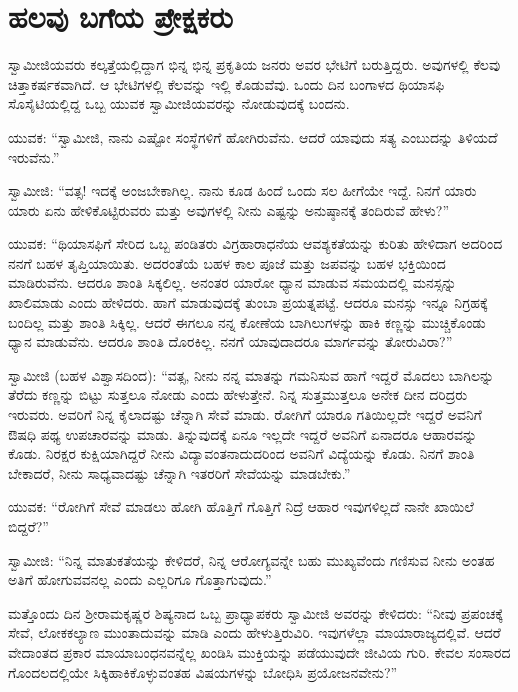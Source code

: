 
\chapter{ಹಲವು ಬಗೆಯ ಪ್ರೇಕ್ಷಕರು}

 ಸ್ವಾಮೀಜಿಯವರು ಕಲ್ಕತ್ತೆಯಲ್ಲಿದ್ದಾಗ ಭಿನ್ನ ಭಿನ್ನ ಪ್ರಕೃತಿಯ ಜನರು ಅವರ ಭೇಟಿಗೆ ಬರುತ್ತಿದ್ದರು. ಅವುಗಳಲ್ಲಿ ಕೆಲವು ಚಿತ್ತಾಕರ್ಷಕವಾಗಿದೆ. ಆ ಭೇಟಿಗಳಲ್ಲಿ ಕೆಲವನ್ನು ಇಲ್ಲಿ ಕೊಡುವೆವು. ಒಂದು ದಿನ ಬಂಗಾಳದ ಥಿಯಾಸಫಿ ಸೊಸೈಟಿಯಲ್ಲಿದ್ದ ಒಬ್ಬ ಯುವಕ ಸ್ವಾಮೀಜಿಯವರನ್ನು ನೋಡುವುದಕ್ಕೆ ಬಂದನು. 

 ಯುವಕ: “ಸ್ವಾಮೀಜಿ, ನಾನು ಎಷ್ಟೋ ಸಂಸ್ಥೆಗಳಿಗೆ ಹೋಗಿರುವೆನು. ಆದರೆ ಯಾವುದು ಸತ್ಯ ಎಂಬುದನ್ನು ತಿಳಿಯದೆ ಇರುವೆನು.” 

 ಸ್ವಾಮೀಜಿ: “ವತ್ಸ! ಇದಕ್ಕೆ ಅಂಜಬೇಕಾಗಿಲ್ಲ. ನಾನು ಕೂಡ ಹಿಂದೆ ಒಂದು ಸಲ ಹೀಗೆಯೇ ಇದ್ದೆ. ನಿನಗೆ ಯಾರು ಯಾರು ಏನು ಹೇಳಿಕೊಟ್ಟಿರುವರು ಮತ್ತು ಅವುಗಳಲ್ಲಿ ನೀನು ಎಷ್ಟನ್ನು ಅನುಷ್ಠಾನಕ್ಕೆ ತಂದಿರುವೆ ಹೇಳು?” 

 ಯುವಕ: “ಥಿಯಾಸಫಿಗೆ ಸೇರಿದ ಒಬ್ಬ ಪಂಡಿತರು ವಿಗ್ರಹಾರಾಧನೆಯ ಆವಶ್ಯಕತೆಯನ್ನು ಕುರಿತು ಹೇಳಿದಾಗ ಅದರಿಂದ ನನಗೆ ಬಹಳ ತೃಪ್ತಿಯಾಯಿತು. ಅದರಂತೆಯೆ ಬಹಳ ಕಾಲ ಪೂಜೆ ಮತ್ತು ಜಪವನ್ನು ಬಹಳ ಭಕ್ತಿಯಿಂದ ಮಾಡಿರುವೆನು. ಆದರೂ ಶಾಂತಿ ಸಿಕ್ಕಲಿಲ್ಲ. ಅನಂತರ ಯಾರೋ ಧ್ಯಾನ ಮಾಡುವ ಸಮಯದಲ್ಲಿ ಮನಸ್ಸನ್ನು ಖಾಲಿಮಾಡು ಎಂದು ಹೇಳಿದರು. ಹಾಗೆ ಮಾಡುವುದಕ್ಕೆ ತುಂಬಾ ಪ್ರಯತ್ನಪಟ್ಟೆ. ಆದರೂ ಮನಸ್ಸು ಇನ್ನೂ ನಿಗ್ರಹಕ್ಕೆ ಬಂದಿಲ್ಲ ಮತ್ತು ಶಾಂತಿ ಸಿಕ್ಕಿಲ್ಲ. ಆದರೆ ಈಗಲೂ ನನ್ನ ಕೋಣೆಯ ಬಾಗಿಲುಗಳನ್ನು ಹಾಕಿ ಕಣ್ಣನ್ನು ಮುಚ್ಚಿಕೊಂಡು ಧ್ಯಾನ ಮಾಡುವೆನು. ಆದರೂ ಶಾಂತಿ ದೊರಕಿಲ್ಲ. ನನಗೆ ಯಾವುದಾದರೂ ಮಾರ್ಗವನ್ನು ತೋರುವಿರಾ?”‌ 

\vskip 1pt

 ಸ್ವಾಮೀಜಿ (ಬಹಳ ವಿಶ್ವಾಸದಿಂದ): “ವತ್ಸ, ನೀನು ನನ್ನ ಮಾತನ್ನು ಗಮನಿಸುವ ಹಾಗೆ ಇದ್ದರೆ ಮೊದಲು ಬಾಗಿಲನ್ನು ತೆರೆದು ಕಣ್ಣನ್ನು ಬಿಟ್ಟು ಸುತ್ತಲೂ ನೋಡು ಎಂದು ಹೇಳುತ್ತೇನೆ. ನಿನ್ನ ಸುತ್ತಮುತ್ತಲೂ‌ ಅನೇಕ ದೀನ ದರಿದ್ರರು ಇರುವರು. ಅವರಿಗೆ ನಿನ್ನ ಕೈಲಾದಷ್ಟು ಚೆನ್ನಾಗಿ ಸೇವೆ ಮಾಡು. ರೋಗಿಗೆ ಯಾರೂ ಗತಿಯಿಲ್ಲದೇ ಇದ್ದರೆ ಅವನಿಗೆ ಔಷಧಿ ಪಥ್ಯ ಉಪಚಾರವನ್ನು ಮಾಡು. ತಿನ್ನುವುದಕ್ಕೆ ಏನೂ ಇಲ್ಲದೇ ಇದ್ದರೆ ಅವನಿಗೆ ಏನಾದರೂ ಆಹಾರವನ್ನು ಕೊಡು. ನಿರಕ್ಷರ ಕುಕ್ಷಿಯಾಗಿದ್ದರೆ ನೀನು ವಿದ್ಯಾವಂತನಾದುದರಿಂದ ಅವನಿಗೆ ವಿದ್ಯೆಯನ್ನು ಕೊಡು. ನಿನಗೆ ಶಾಂತಿ ಬೇಕಾದರೆ, ನೀನು ಸಾಧ್ಯವಾದಷ್ಟು ಚೆನ್ನಾಗಿ ಇತರರಿಗೆ ಸೇವೆಯನ್ನು ಮಾಡಬೇಕು.” 

\vskip 1pt

 ಯುವಕ: “ರೋಗಿಗೆ ಸೇವೆ ಮಾಡಲು ಹೋಗಿ ಹೊತ್ತಿಗೆ ಗೊತ್ತಿಗೆ ನಿದ್ರೆ ಆಹಾರ ಇವುಗಳಿಲ್ಲದೆ ನಾನೇ ಖಾಯಿಲೆ ಬಿದ್ದರೆ?” 

\vskip 1pt

 ಸ್ವಾಮೀಜಿ: “ನಿನ್ನ ಮಾತುಕತೆಯನ್ನು ಕೇಳಿದರೆ, ನಿನ್ನ ಆರೋಗ್ಯವನ್ನೇ ಬಹು ಮುಖ್ಯವೆಂದು ಗಣಿಸುವ ನೀನು ಅಂತಹ ಅತಿಗೆ ಹೋಗುವವನಲ್ಲ ಎಂದು ಎಲ್ಲರಿಗೂ ಗೊತ್ತಾಗುವುದು.” 

\vskip 1pt

 ಮತ್ತೊಂದು ದಿನ ಶ‍್ರೀರಾಮಕೃಷ್ಣರ ಶಿಷ್ಯನಾದ ಒಬ್ಬ ಪ್ರಾಧ್ಯಾಪಕರು ಸ್ವಾಮೀಜಿ ಅವರನ್ನು ಕೇಳಿದರು: “ನೀವು ಪ್ರಪಂಚಕ್ಕೆ ಸೇವೆ, ಲೋಕಕಲ್ಯಾಣ ಮುಂತಾದುವನ್ನು ಮಾಡಿ ಎಂದು ಹೇಳುತ್ತಿರುವಿರಿ. ಇವುಗಳೆಲ್ಲಾ ಮಾಯಾರಾಜ್ಯದಲ್ಲಿವೆ. ಆದರೆ ವೇದಾಂತದ ಪ್ರಕಾರ ಮಾಯಾಬಂಧನವನ್ನೆಲ್ಲ ಖಂಡಿಸಿ ಮುಕ್ತಿಯನ್ನು ಪಡೆಯುವುದೇ ಜೀವಿಯ ಗುರಿ. ಕೇವಲ ಸಂಸಾರದ ಗೊಂದಲದಲ್ಲಿಯೇ ಸಿಕ್ಕಿಹಾಕಿಕೊಳ್ಳುವಂತಹ ವಿಷಯಗಳನ್ನು ಬೋಧಿಸಿ ಪ್ರಯೋಜನವೇನು?” 

